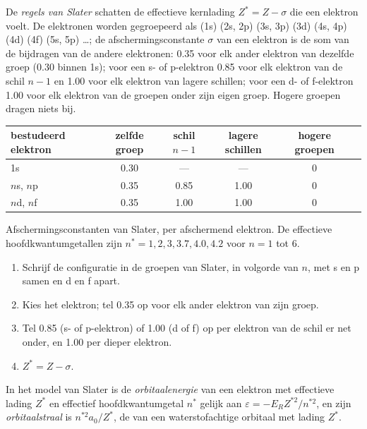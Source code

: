 \begin{definition}\label{def:b2:atomic-orbitals:slater}
De \emph{regels van Slater} schatten de effectieve kernlading
$Z^* = Z - \sigma$ die een elektron voelt. De elektronen worden gegroepeerd als
(1s) (2s, 2p) (3s, 3p) (3d) (4s, 4p) (4d) (4f) (5s, 5p) \dots; de afschermingsconstante
$\sigma$ van een elektron is de som van de bijdragen van de andere
elektronen: 0.35 voor elk ander elektron van dezelfde groep (0.30 binnen 1s);
voor een s- of p-elektron 0.85 voor elk elektron van de schil $n - 1$ en 1.00 voor
elk elektron van lagere schillen; voor een d- of f-elektron 1.00 voor elk elektron
van de groepen onder zijn eigen groep. Hogere groepen dragen niets bij.
\end{definition}

\begin{omfigure}
\small
\renewcommand{\arraystretch}{1.2}
\begin{tabular}{l|ccccc}
bestudeerd elektron & zelfde groep & schil $n - 1$ & lagere schillen & hogere groepen \\ \hline
1s & 0.30 & --- & --- & 0 \\
$n$s, $n$p & 0.35 & 0.85 & 1.00 & 0 \\
$n$d, $n$f & 0.35 & 1.00 & 1.00 & 0 \\
\end{tabular}

\smallskip
{\small Afschermingsconstanten van Slater, per afschermend elektron. De effectieve
hoofdkwantumgetallen zijn $n^* = 1, 2, 3, 3.7, 4.0, 4.2$ voor $n = 1$ tot 6.}
\end{omfigure}

\begin{method}\label{met:b2:atomic-orbitals:slater}
\begin{enumerate}
  \item Schrijf de configuratie in de groepen van Slater, in volgorde van $n$, met s en p
        samen en d en f apart.
  \item Kies het elektron; tel 0.35 op voor elk ander elektron van zijn groep.
  \item Tel 0.85 (s- of p-elektron) of 1.00 (d of f) op per elektron van de schil er net
        onder, en 1.00 per dieper elektron.
  \item $Z^* = Z - \sigma$.
\end{enumerate}
\end{method}

\begin{definition}\label{def:b2:atomic-orbitals:orbital-energy}
In het model van Slater is de \emph{orbitaalenergie} van een elektron
met effectieve lading $Z^*$ en effectief hoofdkwantumgetal $n^*$ gelijk aan
$\varepsilon = -E_RZ^{*2}/n^{*2}$, en zijn \emph{orbitaalstraal}
is $n^{*2}a_0/Z^*$, de  van een waterstofachtige orbitaal met lading
$Z^*$.
\end{definition}

